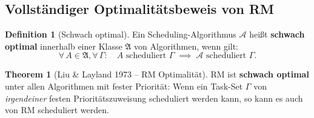 ﻿\documentclass[a4paper,12pt]{report}
\theoremstyle{definition}
\newtheorem{definition}{Definition}[chapter]
\newtheorem{theorem}{Theorem}[chapter]
\begin{document}
\subsection{Vollständiger Optimalitätsbeweis von RM}

\begin{definition}[Schwach optimal]
	\label{def:schwach_optimal}
	Ein Scheduling-Algorithmus $\mathcal{A}$ heißt \textbf{schwach optimal}
	innerhalb einer Klasse $\mathfrak{A}$ von Algorithmen, wenn gilt:
	\[
		\forall\, A \in \mathfrak{A}, \forall\, \Gamma: \quad
		A \text{ scheduliert } \Gamma \;\implies\; \mathcal{A} \text{ scheduliert } \Gamma.
	\]
\end{definition}

\begin{theorem}[Liu \& Layland 1973 -- RM Optimalität]
	\label{thm:rm_optimal}
	RM ist \textbf{schwach optimal} unter allen Algorithmen mit fester Priorität:
	Wenn ein Task-Set $\Gamma$ von \emph{irgendeiner} festen Prioritätszuweisung
	scheduliert werden kann, so kann es auch von RM scheduliert werden.
\end{theorem}
\end{document}
